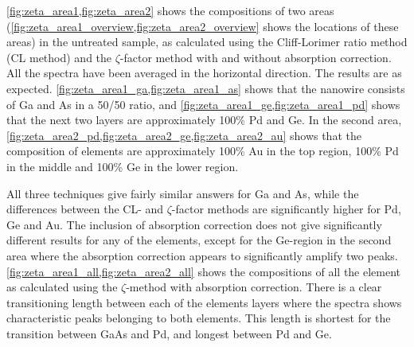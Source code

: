 \cref{fig:zeta_area1,fig:zeta_area2} shows the compositions of two areas (\cref{fig:zeta_area1_overview,fig:zeta_area2_overview} shows the locations of these areas) in the untreated sample, as calculated using the Cliff-Lorimer ratio method (CL method) and the $\zeta$-factor method with and without absorption correction. All the spectra have been averaged in the horizontal direction. The results are as expected. \cref{fig:zeta_area1_ga,fig:zeta_area1_as} shows that the nanowire consists of Ga and As in a 50/50 ratio, and \cref{fig:zeta_area1_ge,fig:zeta_area1_pd} shows that the next two layers are approximately 100\% Pd and Ge. In the second area, \cref{fig:zeta_area2_pd,fig:zeta_area2_ge,fig:zeta_area2_au} shows that the composition of elements are approximately 100\% Au in the top region, 100\% Pd in the middle and 100\% Ge in the lower region.

All three techniques give fairly similar answers for Ga and As, while the differences between the CL- and $\zeta$-factor methods are significantly higher for Pd, Ge and Au. The inclusion of absorption correction does not give significantly different results for any of the elements, except for the Ge-region in the second area where the absorption correction appears to significantly amplify two peaks. \cref{fig:zeta_area1_all,fig:zeta_area2_all} shows the compositions of all the element as calculated using the $\zeta$-method with absorption correction. There is a clear transitioning length between each of the elements layers where the spectra shows characteristic peaks belonging to both elements. This length is shortest for the transition between GaAs and Pd, and longest between Pd and Ge.

